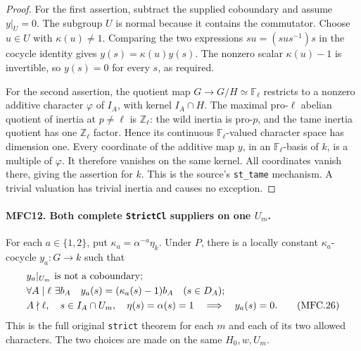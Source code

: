 \begin{proof}
For the first assertion, subtract the supplied coboundary and
assume \(y|_U=0\).  The subgroup \(U\) is normal because it
contains the commutator.  Choose \(u\in U\) with
\(\kappa(u)\ne1\).  Comparing the two expressions
\(su=(sus^{-1})s\) in the cocycle identity gives
\(y(s)=\kappa(u)y(s)\).  The nonzero scalar
\(\kappa(u)-1\) is invertible, so \(y(s)=0\) for every
\(s\), as required.

For the second assertion, the quotient map
\(G\to G/H\simeq\mathbb F_\ell\) restricts to a nonzero
additive character \(\varphi\) of \(I_A\), with kernel
\(I_A\cap H\).  The maximal pro-\(\ell\) abelian quotient
of inertia at \(p\ne\ell\) is \(\mathbb Z_\ell\): the
wild inertia is pro-\(p\), and the tame inertia quotient has
one \(\mathbb Z_\ell\) factor.  Hence its continuous
\(\mathbb F_\ell\)-valued character space has dimension one.
Every coordinate of the additive map \(y\), in an
\(\mathbb F_\ell\)-basis of \(k\), is a multiple of
\(\varphi\).  It therefore vanishes on the same kernel.
All coordinates vanish there, giving the assertion for \(k\).
This is the source's \texttt{st\_tame} mechanism.  A trivial
valuation has trivial inertia and causes no exception.
\end{proof}

\paragraph{MFC12. Both complete \texttt{StrictCl} suppliers on one \(U_m\).}
\label{claim:MFC12}
For each \(a\in\{1,2\}\), put
\(\kappa_a=\alpha^{-a}\eta_k\).  Under \(P\), there is
a locally constant \(\kappa_a\)-cocycle \(y_a:G\to k\)
such that
\begin{align}
 &y_a|_{U_m}\text{ is not a coboundary};\notag\\
 &\forall A\mid\ell\ \exists b_A\quad
       y_a(s)=(\kappa_a(s)-1)b_A\quad(s\in D_A);\notag\\
 &A\nmid\ell,\quad s\in I_A\cap U_m,\quad
       \eta(s)=\alpha(s)=1\quad\Longrightarrow\quad y_a(s)=0.
                                                               \tag{MFC.26}
\end{align}
This is the full original \texttt{strict} theorem for each
\(m\) and each of its two allowed characters.  The two choices
are made on the same \(H_0,w,U_m\).

